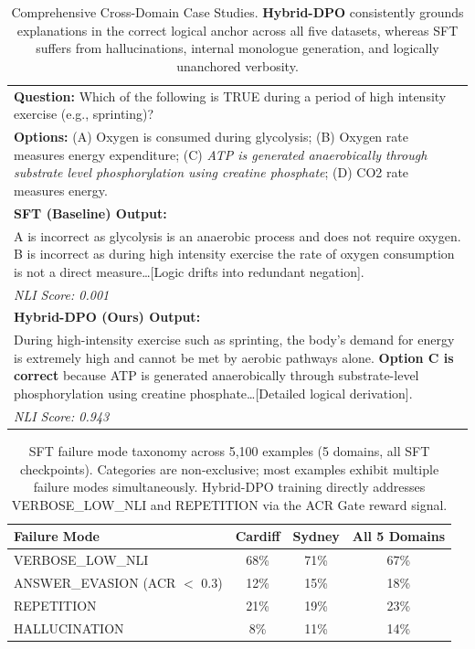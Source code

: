 \begin{table}[h]
\centering
\small
\begin{tabular}{p{}}
\toprule
\textbf{Question:} Which of the following is TRUE during a period of high intensity exercise (e.g., sprinting)? \\
\textbf{Options:} (A) Oxygen is consumed during glycolysis; (B) Oxygen rate measures energy expenditure; (C) \textit{ATP is generated anaerobically through substrate level phosphorylation using creatine phosphate}; (D) CO2 rate measures energy. \\
\midrule
\textbf{SFT (Baseline) Output:} \\
A is incorrect as glycolysis is an anaerobic process and does not require oxygen. B is incorrect as during high intensity exercise the rate of oxygen consumption is not a direct measure\ldots [Logic drifts into redundant negation]. \\
\textit{NLI Score: 0.001} \\
\midrule
\textbf{Hybrid-DPO (Ours) Output:} \\
During high-intensity exercise such as sprinting, the body's demand for energy is extremely high and cannot be met by aerobic pathways alone. \textbf{Option C is correct} because ATP is generated anaerobically through substrate-level phosphorylation using creatine phosphate\ldots [Detailed logical derivation]. \\
\textit{NLI Score: 0.943} \\
\bottomrule
\end{tabular}
\caption{Comprehensive Cross-Domain Case Studies. \textbf{Hybrid-DPO} consistently grounds explanations in the correct logical anchor across all five datasets, whereas SFT suffers from hallucinations, internal monologue generation, and logically unanchored verbosity.}
\label{tab:case_study}
\end{table}

\begin{table}[h]
\centering
\small
\begin{tabular}{l|c|c|c}
\toprule
Failure Mode & Cardiff & Sydney & All 5 Domains \\
\midrule
VERBOSE\_LOW\_NLI & 68\% & 71\% & 67\% \\
ANSWER\_EVASION (ACR $<$ 0.3) & 12\% & 15\% & 18\% \\
REPETITION & 21\% & 19\% & 23\% \\
HALLUCINATION & 8\% & 11\% & 14\% \\
\bottomrule
\end{tabular}
\caption{SFT failure mode taxonomy across 5,100 examples (5 domains, all SFT checkpoints). Categories are non-exclusive; most examples exhibit multiple failure modes simultaneously. Hybrid-DPO training directly addresses VERBOSE\_LOW\_NLI and REPETITION via the ACR Gate reward signal.}
\label{tab:failure_modes}
\end{table}

